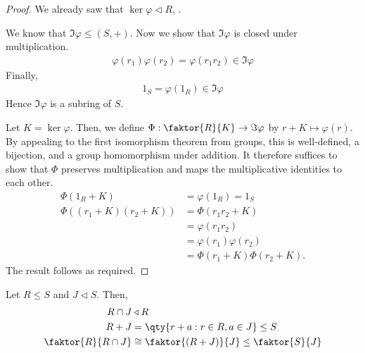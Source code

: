 \begin{proof}
	We already saw that $\ker \varphi \triangleleft R$, .

	We know that $\Im \varphi \leq (S, +)$.
	Now we show that $\Im \varphi$ is closed under multiplication.
	\begin{align*}
		\varphi(r_1) \varphi(r_2) = \varphi(r_1 r_2) \in \Im \varphi
	\end{align*}
	Finally,
	\begin{align*}
		1_S = \varphi(1_R) \in \Im \varphi
	\end{align*}
	Hence $\Im \varphi$ is a subring of $S$.

	Let $K = \ker \varphi$.
	Then, we define $\Phi : \faktor{R}{K} \to \Im \varphi$ by $r+K \mapsto \varphi(r)$.
	By appealing to the first isomorphism theorem from groups, this is well-defined, a bijection, and a group homomorphism under addition.
	It therefore suffices to show that $\Phi$ preserves multiplication and maps the multiplicative identities to each other.
	\begin{align*}
		\Phi(1_R + K) &= \varphi(1_R) = 1_S \\
		\Phi((r_1+K)(r_2+K)) &= \Phi(r_1 r_2 +K) \\
		&= \varphi(r_1 r_2) \\
		&= \varphi(r_1) \varphi(r_2) \\
		&= \Phi(r_1 + K) \Phi(r_2 + K).
	\end{align*}
	The result follows as required.
\end{proof}

\begin{theorem}
	Let $R \leq S$ and $J \triangleleft S$.
	Then,
	\begin{align*}
		R \cap J &\triangleleft R \\
		R + J &= \qty{r+a : r\in R, a \in J} \leq S \\
		\faktor{R}{R \cap J} &\cong \faktor{(R+J)}{J} \leq \faktor{S}{J}
	\end{align*}
\end{theorem}

